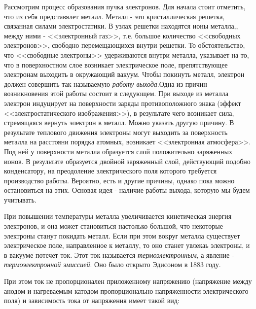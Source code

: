 \documentclass[14pt]{article}
\begin{document}
Рассмотрим процесс образования пучка электронов. Для начала стоит отметить, что из себя представялет металл. Металл - это кристаллическая решетка, связанная силами электростатики. В узлах решетки находятся ионы металла,, между ними  - <<электронный газ>>, т.е. большое количество <<свободных электронов>>, свободно перемещающихся внутри решетки. То обстоятельство, что <<свободные электроны>> удерживаются внутри металла, указывает на то, что в поверхностном слое возникает электрическое поле, препятствующее электронам выходить в окружающий вакуум. Чтобы покинуть металл, электрон должен совершить так называемую \textsl{работу выхода}.Одна из причин возникновения этой работы состоит в следующем. При выходе из металла электрон индуцирует на поверхности заряды противоположного знака (эффект <<электростатического изображения>>), в результате чего возникает сила, стремящаяся вернуть электрон в металл. Можно указать другую причину. В результате теплового движения электроны могут выходить за поверхность металла на расстояни порядка атомных, возникает <<электронная атмосфера>>. Под ней у поверхности металла образуется слой положительно заряженных ионов. В результате образуется двойной заряженный слой, действующий подобно конденсатору, на преодоление электрического поля которого требуется производство работы. Вероятно, есть и другие причины, однако пока можно остановиться на этих. Основая идея - наличие работы выхода, которую мы будем учитывать. 

При повышении температуры металла увеличивается кинетическая энергия электронов, и она может становиться настолько большой, что некоторые электроны станут покидать металл. Если при этом вокруг металла существует электрическое поле, направленное к металлу, то оно станет увлекаь электроны, и в вакууме потечет ток. Этот ток называется \textsl{термоэлектронным}, а явление - \textsl{термоэлектронной эмиссией}. Оно было открыто Эдисоном в 1883 году. 

При этом ток не пропорционален приложенному напряжению (напряжение между анодом и нагреваемым катодом пропорционально напряженности электрического поля) и зависимость тока от напряжения имеет такой вид:

\begin{figure}[h!]
\end{figure}
\end{document}
